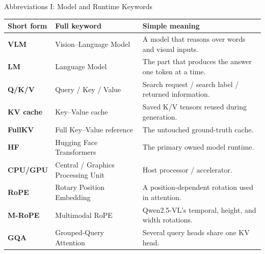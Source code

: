 \documentclass[aspectratio=169,10pt]{beamer}
\begin{document}
\begin{frame}{Abbreviations I: Model and Runtime Keywords}
\scriptsize
\begin{tabularx}{\textwidth}{>{\bfseries}p{}p{}X}
\toprule
Short form & Full keyword & Simple meaning \\
\midrule
VLM & Vision--Language Model & A model that reasons over words and visual inputs. \\
LM & Language Model & The part that produces the answer one token at a time. \\
Q/K/V & Query / Key / Value & Search request / search label / returned information. \\
KV cache & Key--Value cache & Saved K/V tensors reused during generation. \\
FullKV & Full Key--Value reference & The untouched ground-truth cache. \\
HF & Hugging Face Transformers & The primary owned model runtime. \\
CPU/GPU & Central / Graphics Processing Unit & Host processor / accelerator. \\
RoPE & Rotary Position Embedding & A position-dependent rotation used in attention. \\
M-RoPE & Multimodal RoPE & Qwen2.5-VL's temporal, height, and width rotations. \\
GQA & Grouped-Query Attention & Several query heads share one KV head. \\
\bottomrule
\end{tabularx}
\end{frame}
\end{document}
